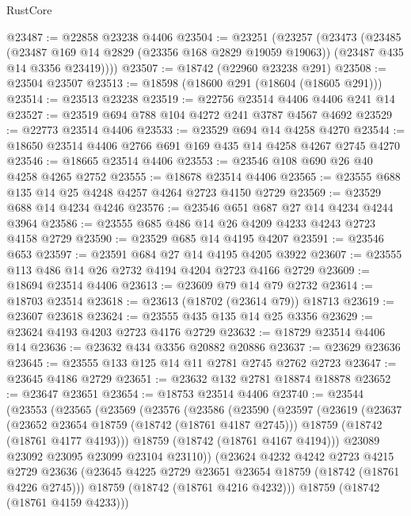 \begin{lexlean}{RustCore}
\begin{coremodule}
@23487 := @22858 @23238 @4406
@23504 := @23251
    (@23257
      (@23473
        (@23485
          (@23487 @169 @14 @2829 (@23356 @168 @2829 @19059 @19063))
          (@23487 @435 @14 @3356 @23419))))
@23507 := @18742 (@22960 @23238 @291)
@23508 := @23504 @23507
@23513 := @18598 (@18600 @291 (@18604 (@18605 @291)))
@23514 := @23513 @23238
@23519 := @22756 @23514 @4406 @4406 @241 @14
@23527 := @23519 @694 @788 @104 @4272 @241 @3787 @4567 @4692
@23529 := @22773 @23514 @4406
@23533 := @23529 @694 @14 @4258 @4270
@23544 := @18650 @23514 @4406 @2766 @691 @169 @435 @14 @4258 @4267 @2745 @4270
@23546 := @18665 @23514 @4406
@23553 := @23546 @108 @690 @26 @40 @4258 @4265 @2752
@23555 := @18678 @23514 @4406
@23565 := @23555 @688 @135 @14 @25 @4248 @4257 @4264 @2723 @4150 @2729
@23569 := @23529 @688 @14 @4234 @4246
@23576 := @23546 @651 @687 @27 @14 @4234 @4244 @3964
@23586 := @23555 @685 @486 @14 @26 @4209 @4233 @4243 @2723 @4158 @2729
@23590 := @23529 @685 @14 @4195 @4207
@23591 := @23546 @653
@23597 := @23591 @684 @27 @14 @4195 @4205 @3922
@23607 := @23555 @113 @486 @14 @26 @2732 @4194 @4204 @2723 @4166 @2729
@23609 := @18694 @23514 @4406
@23613 := @23609 @79 @14 @79 @2732
@23614 := @18703 @23514
@23618 := @23613 (@18702 (@23614 @79)) @18713
@23619 := @23607 @23618
@23624 := @23555 @435 @135 @14 @25 @3356
@23629 := @23624 @4193 @4203 @2723 @4176 @2729
@23632 := @18729 @23514 @4406 @14
@23636 := @23632 @434 @3356 @20882 @20886
@23637 := @23629 @23636
@23645 := @23555 @133 @125 @14 @11 @2781 @2745 @2762 @2723
@23647 := @23645 @4186 @2729
@23651 := @23632 @132 @2781 @18874 @18878
@23652 := @23647 @23651
@23654 := @18753 @23514 @4406
@23740 := @23544
    (@23553
      (@23565
        (@23569
          (@23576
            (@23586
              (@23590
                (@23597
                  (@23619
                    (@23637
                      (@23652 @23654 @18759 (@18742 (@18761 @4187 @2745)))
                      @18759
                      (@18742 (@18761 @4177 @4193)))
                    @18759
                    (@18742 (@18761 @4167 @4194)))
                  @23089
                  @23092
                  @23095
                  @23099
                  @23104
                  @23110))
              (@23624
                @4232
                @4242
                @2723
                @4215
                @2729
                @23636
                (@23645 @4225 @2729 @23651 @23654 @18759 (@18742 (@18761 @4226 @2745)))
                @18759
                (@18742 (@18761 @4216 @4232)))
              @18759
              (@18742 (@18761 @4159 @4233)))

\end{coremodule}
\end{lexlean}
